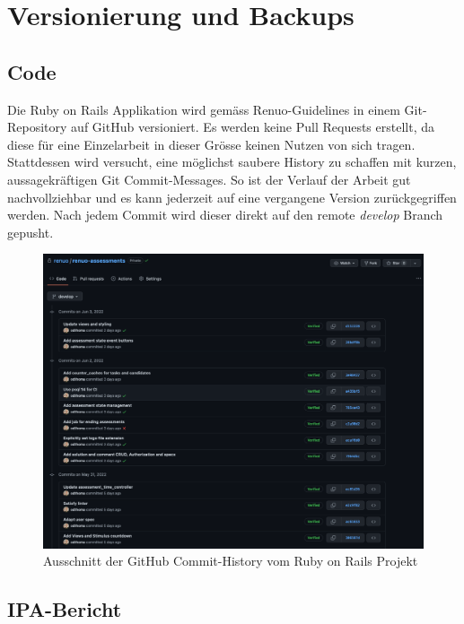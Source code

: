 \section{Versionierung und Backups} \label{sec:backups}

\subsection{Code}

Die Ruby on Rails Applikation wird gemäss Renuo-Guidelines in einem Git-Repository auf GitHub versioniert. Es werden keine Pull Requests erstellt,
da diese für eine Einzelarbeit in dieser Grösse keinen Nutzen von sich tragen. Stattdessen wird versucht, eine möglichst saubere History zu schaffen mit kurzen, aussagekräftigen Git Commit-Messages.
So ist der Verlauf der Arbeit gut nachvollziehbar und es kann jederzeit auf eine vergangene Version zurückgegriffen werden. Nach jedem Commit
wird dieser direkt auf den remote \emph{develop} Branch gepusht.

\begin{figure}[H]
    \centering
    \includegraphics[width=\textwidth]{images/renuo-assessments-github.png}
    \caption{\label{fig:renuo-assessments-github}Ausschnitt der GitHub Commit-History vom Ruby on Rails Projekt}
\end{figure}

\newpage

\subsection{IPA-Bericht}

